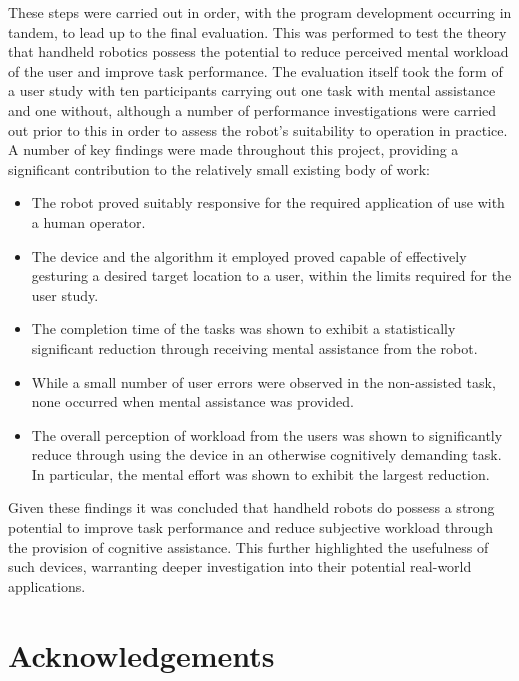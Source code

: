 \documentclass[11pt]{article}
\begin{document}
These steps were carried out in order, with the program development occurring in tandem, to lead up to the final evaluation. This was performed to test the theory that handheld robotics possess the potential to reduce perceived mental workload of the user and improve task performance. The evaluation itself took the form of a user study with ten participants carrying out one task with mental assistance and one without, although a number of performance investigations were carried out prior to this in order to assess the robot's suitability to operation in practice. A number of key findings were made throughout this project, providing a significant contribution to the relatively small existing body of work:
\begin{itemize}
\item{The robot proved suitably responsive for the required application of use with a human operator.}
\item{The device and the algorithm it employed proved capable of effectively gesturing a desired target location to a user, within the limits required for the user study.}
\item{The completion time of the tasks was shown to exhibit a statistically significant reduction through receiving mental assistance from the robot.}
\item{While a small number of user errors were observed in the non-assisted task, none occurred when mental assistance was provided.}
\item{The overall perception of workload from the users was shown to significantly reduce through using the device in an otherwise cognitively demanding task. In particular, the mental effort was shown to exhibit the largest reduction.}
\end{itemize}

Given these findings it was concluded that handheld robots do possess a strong potential to improve task performance and reduce subjective workload through the provision of cognitive assistance. This further highlighted the usefulness of such devices, warranting deeper investigation into their potential real-world applications. 

\pagebreak

\section*{Acknowledgements}
\pagebreak

\renewcommand{\thepage}{\arabic{page}}%
\end{document}
